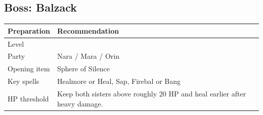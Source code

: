 \documentclass[
  american,
  10pt,
  letterpaper,
  oneside,
  open=any]{scrreprt}
\newcounter{none} %
\newenvironment{guidetable}{%
  \small\setstretch{1.0}%
  \setlength{\tabcolsep}{4pt}%
  \setlength{\LTpre}{8pt}\setlength{\LTpost}{10pt}%
  \renewcommand{\arraystretch}{1.16}%
}{ }
\begin{document}
\subsection{Boss: Balzack}\label{boss-balzack}

\begin{guidetable}

{\def\LTcaptype{none} %
\begin{longtable}[]{@{}
  >{\raggedright\arraybackslash}p{}
  >{\raggedright\arraybackslash}p{}@{}}
\toprule\noalign{}
\begin{minipage}[b]{\linewidth}\raggedright
\color{GuideGreen}\bfseries Preparation
\end{minipage} & \begin{minipage}[b]{\linewidth}\raggedright
\color{GuideGreen}\bfseries Recommendation
\end{minipage} \\
\midrule\noalign{}
\endhead
\bottomrule\noalign{}
\endlastfoot
Level & 13 \\
Party & Nara / Mara / Orin \\
Opening item & Sphere of Silence \\
Key spells & Healmore or Heal, Sap, Firebal or Bang \\
HP threshold & Keep both sisters above roughly 20 HP and heal earlier
after heavy damage. \\
\end{longtable}
}

\end{guidetable}
\end{document}
